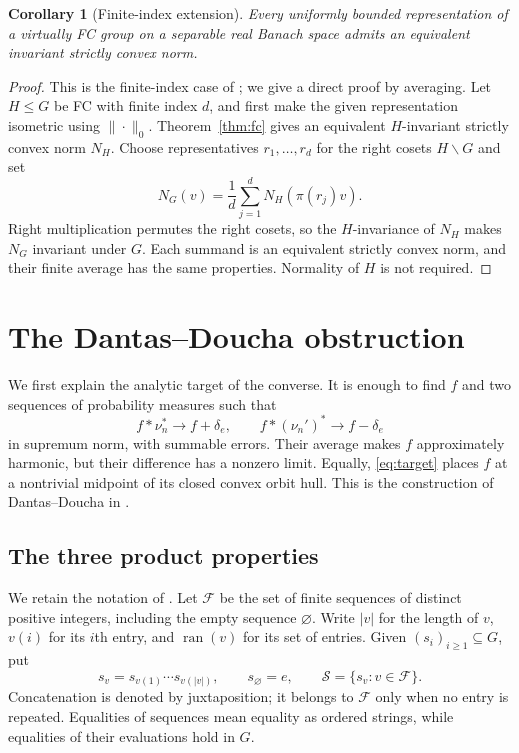 \documentclass[11pt,letterpaper]{amsart}
\newtheorem{corollary}[theorem]{Corollary}
\theoremstyle{definition}
\theoremstyle{remark}
\DeclareMathOperator{\ran}{ran}
\begin{document}
\begin{corollary}[Finite-index extension]\label{cor:virtual}
Every uniformly bounded representation of a virtually FC group on a
separable real Banach space admits an equivalent invariant strictly convex norm.
\end{corollary}
\begin{proof}
This is the finite-index case of \cite[Lemma~3.2 and
Proposition~5.1]{DD}; we give a direct proof by averaging.
Let $H\leq G$ be FC with finite index $d$, and first make the given
representation isometric using $\|\cdot\|_0$.
Theorem~\ref{thm:fc} gives an equivalent $H$-invariant strictly convex norm $N_H$.
Choose representatives $r_1,\ldots,r_d$ for the right cosets
$H\backslash G$ and set
\[
 N_G(v)=\frac1d\sum_{j=1}^d N_H(\pi(r_j)v).
\]
Right multiplication permutes the right cosets, so the
$H$-invariance of $N_H$ makes $N_G$ invariant under $G$.
Each summand is an equivalent strictly convex norm, and their finite
average has the same properties. Normality of $H$ is not required.
\end{proof}

\section{The Dantas--Doucha obstruction}\label{sec:obstruction}
We first explain the analytic target of the converse. It is enough to
find $f$ and two sequences of probability measures such that
\begin{equation}\label{eq:target}
 f*\nu_n^*\longrightarrow f+\delta_e,\qquad
 f*(\nu_n')^*\longrightarrow f-\delta_e
\end{equation}
in supremum norm, with summable errors. Their average makes $f$
approximately harmonic, but their difference has a nonzero limit.
Equally, \eqref{eq:target} places $f$ at a nontrivial midpoint of its
closed convex orbit hull. This is the construction of Dantas--Doucha
in \cite[Example~5.5, Claim~2]{DD}.

\subsection{The three product properties}
We retain the notation of \cite[Example~5.5]{DD}. Let $\mathcal F$
be the set of finite sequences of distinct positive integers, including
the empty sequence $\varnothing$. Write $|v|$ for the length of $v$,
$v(i)$ for its $i$th entry, and $\ran(v)$ for its set of entries.
Given $(s_i)_{i\geq1}\subseteq G$, put
\[
 s_v=s_{v(1)}\cdots s_{v(|v|)},\qquad
 s_\varnothing=e,\qquad \mathcal S=\{s_v:v\in\mathcal F\}.
\]
Concatenation is denoted by juxtaposition; it belongs to $\mathcal F$
only when no entry is repeated. Equalities of sequences mean equality
as ordered strings, while equalities of their evaluations hold in $G$.
\end{document}

